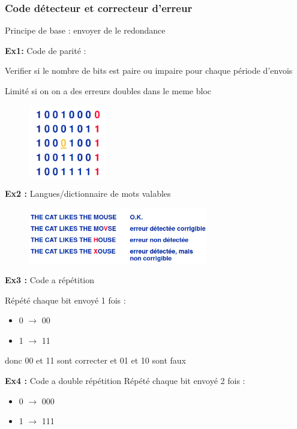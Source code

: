 \documentclass[12pt]{article}
\begin{document}
		\subsubsection{Code détecteur et correcteur d'erreur}
		
			Principe de base : envoyer de le redondance
			
			\textbf{Ex1:} Code de parité :
				
				Verifier si le nombre de bits est paire ou impaire pour chaque période d'envois
				
				Limité si on on a des erreurs doubles dans le meme bloc
				
				\begin{figure}[htp]
					\centering
					\includegraphics[width=0.3\textwidth]{img/Erreur.png}
				\end{figure}
				
			\newpage
				
			\textbf{Ex2 :} Langues/dictionnaire de mots valables
			
			\begin{figure}[htp]
				\centering
				\includegraphics[width=0.7\textwidth]{img/Erreur2.png}
			\end{figure}
			
			\textbf{Ex3 : }Code a répétition
		
				Répété chaque bit envoyé 1 fois :
				\begin{itemize}
					\item 0 $\rightarrow$ 00
					\item 1 $\rightarrow$ 11
				\end{itemize}
				
				donc 00 et 11 sont correcter et 01 et 10 sont faux
				
			\textbf{Ex4 : }Code a double répétition
				Répété chaque bit envoyé 2 fois :
				\begin{itemize}
					\item 0 $\rightarrow$ 000
					\item 1 $\rightarrow$ 111
				\end{itemize}
				
\end{document}
